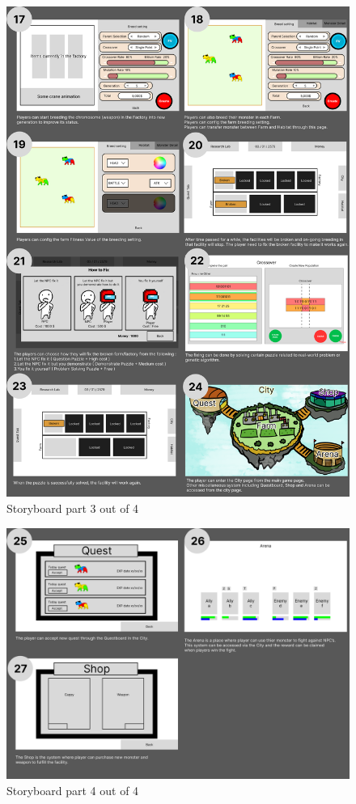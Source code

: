 \documentclass[12pt,oneside,openright,a4paper]{cpe-english-project}
\begin{document}
\begin{figure}[!h]\centering \includegraphics[width=14cm]{appendix-a-figure/storyboard3.png} \caption{Storyboard part 3 out of 4} \end{figure}
\newpage
\begin{figure}[!h]\centering \includegraphics[width=14cm]{appendix-a-figure/storyboard4.png} \caption{Storyboard part 4 out of 4} \end{figure}
\newpage
\end{document}
